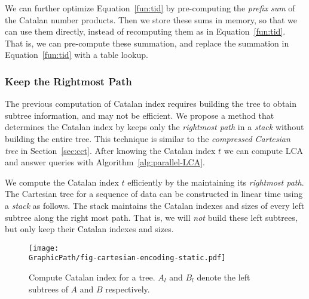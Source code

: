 % 



We can further optimize Equation~\ref{fun:tid} by pre-computing the
{\em prefix sum} of the Catalan number products.  Then we store these
sums in memory, so that we can use them directly, instead of
recomputing them as in Equation~\ref{fun:tid}.  That is, we can
pre-compute these summation, and replace the summation in
Equation~\ref{fun:tid} with a table lookup.


\subsubsection{Keep the Rightmost Path}

The previous computation of Catalan index requires building the tree
to obtain subtree information, and may not be efficient.  We propose a
method that determines the Catalan index by keeps only the {\em
  rightmost path} in a {\em stack} without building the entire tree.
This technique is similar to the {\em compressed Cartesian tree} in
Section~\ref{sec:cct}.  After knowing the Catalan index $t$ we can
compute LCA and answer queries with Algorithm~\ref{alg:parallel-LCA}.

We compute the Catalan index $t$ efficiently by the maintaining its
{\em rightmost path}.  The Cartesian tree for a sequence of data can
be constructed in linear time using a {\em stack} as follows.  The
stack maintains the Catalan indexes and sizes of every left subtree
along the right most path.  That is, we will {\em not} build these
left subtrees, but only keep their Catalan indexes and sizes.

\begin{figure}[!thb]
  \centering
  \texttt{[image: \\GraphicPath/fig-cartesian-encoding-static.pdf]}
  \caption{Compute Catalan index for a tree.  $A_l$ and $B_l$ denote
    the left subtrees of $A$ and $B$ respectively.}
  \label{fig:fig-cartesian-encoding-static}
\end{figure}

